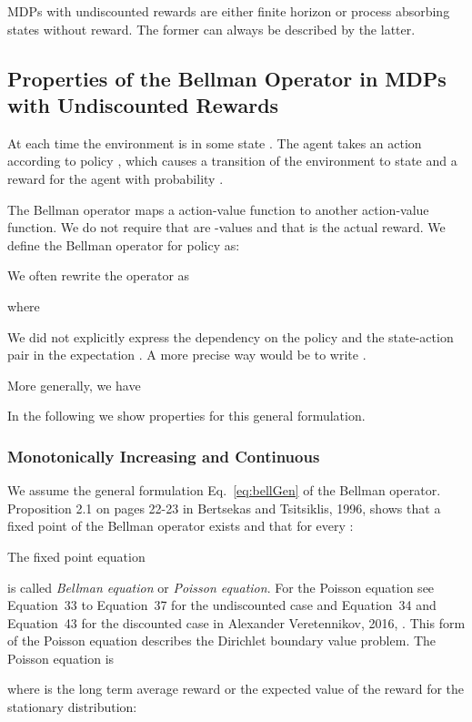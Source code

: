 \documentclass{article}
\begin{document}
\begin{appendices}
MDPs with undiscounted rewards are either finite horizon or process absorbing 
states without reward. The former can always be described by the latter.


\subsection{Properties of the Bellman Operator in MDPs with Undiscounted Rewards}
\label{sec:ApropPoly}

At each time  the environment is in some state . The agent
takes an action  according to policy , which causes a transition of
the environment to state 
and a reward  for the agent
with probability .


The Bellman operator maps a action-value function  to another
action-value function. We do not require that  are -values and
that  is the actual reward. 
We define the Bellman operator  for policy  as:
 

We often rewrite the operator as
 
where
 
We did not explicitly express the dependency on the policy  and
the state-action pair  in the
expectation . A more precise way would be to write
.


More generally, we have
 
In the following we show properties for this general formulation.

\subsubsection{Monotonically Increasing and Continuous}
\label{sec:ApropPolyFP}

We assume the general formulation Eq.~\eqref{eq:bellGen} of the
Bellman operator.
Proposition 2.1 on pages 22-23 in
Bertsekas and Tsitsiklis, 1996, \cite{Bertsekas:96} shows that
a fixed point  of the Bellman operator exists and that for every
:
 
The fixed point equation 

is called {\em Bellman equation} or {\em Poisson equation}.
For the Poisson equation see
Equation~33 to Equation~37 for the undiscounted case and Equation~34 and Equation~43 for the
discounted case in Alexander Veretennikov, 2016,
\cite{Veretennikov:16}.
This form of the Poisson equation describes the Dirichlet boundary
value problem. The Poisson equation is
 
where  is the long term average reward or the expected 
value of the reward for the stationary distribution:
 

\end{appendices}
\end{document}
